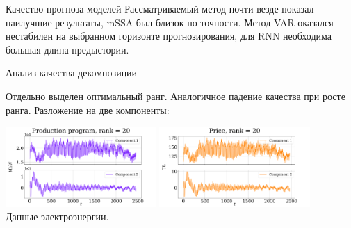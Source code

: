 \documentclass[10pt]{beamer}
\theoremstyle{definition}
\begin{document}
\begin{frame}{Качество прогноза моделей}
		Рассматриваемый метод почти везде показал наилучшие результаты, mSSA был близок по точности. Метод VAR оказался нестабилен на выбранном горизонте прогнозирования, для RNN необходима большая длина предыстории.
		
	\end{frame}
	
	\begin{frame}{Анализ качества декомпозиции}
		
		\begin{figure}
		\end{figure}
		
		Отдельно выделен оптимальный ранг. Аналогичное падение качества при росте ранга. Разложение на две компоненты:
		
		\begin{center}
			\includegraphics[width=0.43\textwidth, keepaspectratio]{../../experiments/electricity/tssa/figs/decomposition/cpd_rank_20/Production program.png}
			\includegraphics[width=0.43\textwidth, keepaspectratio]{../../experiments/electricity/tssa/figs/decomposition/cpd_rank_20/Price.png} \\
			{\small Данные электроэнергии.} \\
		\end{center}
		
	\end{frame}
	
\end{document}

